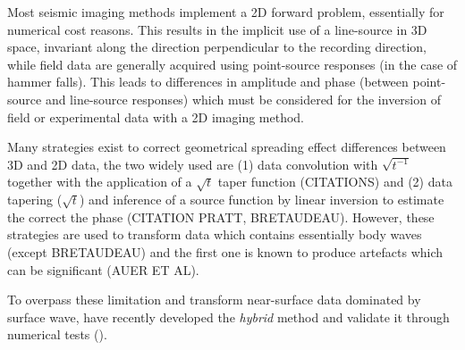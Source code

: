 \documentclass[extra,mreferee]{gji}
\newenvironment{greennote}{\par\color{OliveGreen}}{\par}
\begin{document}
\begin{greennote}
Most seismic imaging methods implement a 2D forward problem, essentially for numerical cost reasons. This results in the implicit use of a line-source in 3D space, invariant along the direction perpendicular to the recording direction, while field data are generally acquired using point-source responses (in the case of hammer falls). This leads to differences in amplitude and phase (between point-source and line-source responses) which must be considered for the inversion of field or experimental data with a 2D imaging method.

Many strategies exist to correct geometrical spreading effect differences between 3D and 2D data, the two widely used are (1) data convolution with $\sqrt{t^{-1}}$ together with the application of a $\sqrt{t}$ taper function (CITATIONS) and (2) data tapering ($\sqrt{t}$) and inference of a source function by linear inversion to estimate the correct the phase (CITATION PRATT, BRETAUDEAU). However, these strategies are used to transform data which contains essentially body waves (except BRETAUDEAU) and the first one is known to produce artefacts which can be significant (AUER ET AL).   

To overpass these limitation and transform near-surface data dominated by surface wave, \cite{Forbriger_LSS_2014} have recently developed the \textit{hybrid} method and validate it through numerical tests (\cite{schafer_lss_2014}).






\end{greennote}
\end{document}
